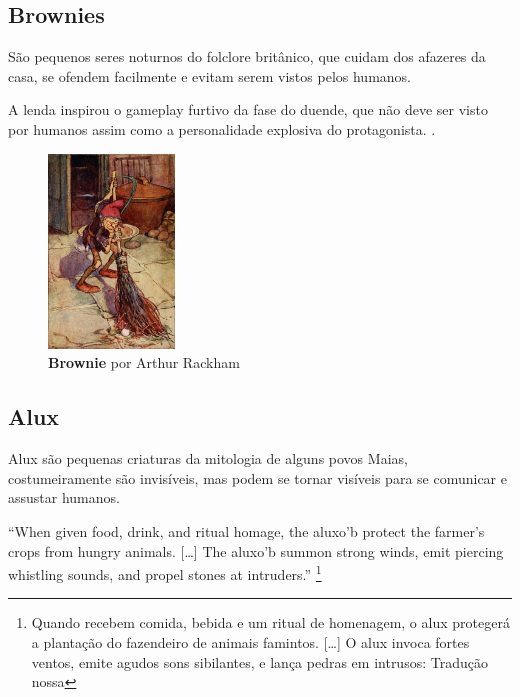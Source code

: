 \subsection{Brownies}

São pequenos seres noturnos do folclore britânico, que cuidam dos afazeres da casa, se ofendem facilmente e evitam serem vistos pelos humanos.

A lenda inspirou o gameplay furtivo da fase do duende, que não deve ser visto por humanos assim como a personalidade explosiva do protagonista.
\cite{britannica_2011, carolyn_2016}.

\clearpage

\begin{figure}[!htb]
    \caption{\label{fig_brownie}\textbf{Brownie} por Arthur Rackham }
    \begin{center} \includegraphics[width=0.3\textwidth]{imagens/brownie.jpg}
    \end{center}  \end{figure}




\subsection{Alux}

Alux são pequenas criaturas da mitologia de alguns povos Maias, costumeiramente
são invisíveis, mas podem se tornar visíveis para se comunicar e assustar
humanos. 

\begin{citacao}
``When given food, drink, and ritual homage, the aluxo'b protect the farmer’s crops from hungry animals. [\ldots] The aluxo'b summon strong winds, emit piercing whistling sounds, and propel stones at intruders.'' 
\cite{storniolo2009out} \footnote{Quando recebem comida, bebida e
um ritual de homenagem, o alux protegerá a plantação do fazendeiro de
animais famintos. [\ldots] O alux invoca fortes ventos, emite agudos sons
sibilantes, e lança pedras em intrusos: Tradução nossa}
\end{citacao}


